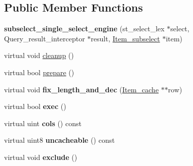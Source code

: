 \subsection*{Public Member Functions}
\begin{DoxyCompactItemize}
\item 
\mbox{\label{classsubselect__single__select__engine_abcb748566b58033a713accc95c90d7e6}} 
{\bfseries subselect\+\_\+single\+\_\+select\+\_\+engine} (st\+\_\+select\+\_\+lex $\ast$select, Query\+\_\+result\+\_\+interceptor $\ast$result, \mbox{\hyperlink{classItem__subselect}{Item\+\_\+subselect}} $\ast$item)
\item 
virtual void \mbox{\hyperlink{classsubselect__single__select__engine_a971db624407ef715670e8652cf6bff06}{cleanup}} ()
\item 
virtual bool \mbox{\hyperlink{classsubselect__single__select__engine_abea1c2122554f643c8b82b648f63ba39}{prepare}} ()
\item 
\mbox{\label{classsubselect__single__select__engine_a16324f206eb3c04fa2f881998492379a}} 
virtual void {\bfseries fix\+\_\+length\+\_\+and\+\_\+dec} (\mbox{\hyperlink{classItem__cache}{Item\+\_\+cache}} $\ast$$\ast$row)
\item 
\mbox{\label{classsubselect__single__select__engine_ac8aaf4329dcf3b6b9388855dd5a3b894}} 
virtual bool {\bfseries exec} ()
\item 
\mbox{\label{classsubselect__single__select__engine_a7cc0b94af4f90ab0be19a5e4b13b6120}} 
virtual uint {\bfseries cols} () const
\item 
\mbox{\label{classsubselect__single__select__engine_a555d83eba4b65ba55424cd0fa82b7e95}} 
virtual uint8 {\bfseries uncacheable} () const
\item 
\mbox{\label{classsubselect__single__select__engine_a8dbebca9f846971603c44ece54eb650a}} 
virtual void {\bfseries exclude} ()
\item 
\mbox{\label{classsubselect__single__select__engine_ab99d6430bdfe824c20c0f66ae7fcc7f5}} 
$$
\end{DoxyCompactItemize}
